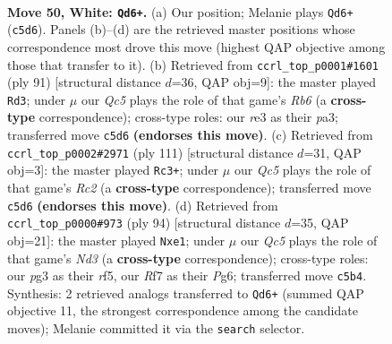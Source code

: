 \documentclass[11pt]{article}
\begin{document}
\clearpage

\begin{figure}[p]\centering
\begin{subfigure}{0.46\textwidth}\centering
\resizebox{\linewidth}{!}{%
\newchessgame
\chessboard[
  setfen={3k4/5R2/8/2QP4/8/4r1p1/P1P1p1P1/4K3 w - - 1 50},
  showmover=false,
  pgfstyle=straightmove, color=movearrow, markmove={c5-d6}
]}
\caption{}
\end{subfigure}\hfill
\begin{subfigure}{0.46\textwidth}\centering
\resizebox{\linewidth}{!}{%
\newchessgame
\chessboard[
  setfen={8/6k1/2K1p1p1/6Pp/R6P/Pr6/8/8 b - - 0 46},
  showmover=false,
  pgfstyle=straightmove, color=movearrow, markmove={b3-d3}
]}
\caption{}
\end{subfigure}
\\[4pt]
\begin{subfigure}{0.46\textwidth}\centering
\resizebox{\linewidth}{!}{%
\newchessgame
\chessboard[
  setfen={8/1pr5/7p/3pk3/1R4PP/1P2K3/8/8 b - - 6 56},
  showmover=false,
  pgfstyle=straightmove, color=movearrow, markmove={c7-c3}
]}
\caption{}
\end{subfigure}\hfill
\begin{subfigure}{0.46\textwidth}\centering
\resizebox{\linewidth}{!}{%
\newchessgame
\chessboard[
  setfen={6k1/6p1/6P1/5r2/P1P2p2/3N4/5PK1/4r3 w - - 0 48},
  showmover=false,
  pgfstyle=straightmove, color=movearrow, markmove={d3-e1}
]}
\caption{}
\end{subfigure}
\caption{\textbf{Move 50, White: \texttt{Qd6+}.} (a) Our position; Melanie plays \texttt{Qd6+} (\texttt{c5d6}). Panels (b)--(d) are the retrieved master positions whose correspondence most drove this move (highest QAP objective among those that transfer to it). (b) Retrieved from \texttt{ccrl\_top\_p0001\#1601} (ply 91) [structural distance $d$=36, QAP obj=9]: the master played \texttt{Rd3}; under $\mu$ our \emph{Qc5} plays the role of that game's \emph{Rb6} (a \textbf{cross-type} correspondence); cross-type roles: our \emph{r}e3 as their \emph{p}a3; transferred move \texttt{c5d6} \textbf{(endorses this move)}. (c) Retrieved from \texttt{ccrl\_top\_p0002\#2971} (ply 111) [structural distance $d$=31, QAP obj=3]: the master played \texttt{Rc3+}; under $\mu$ our \emph{Qc5} plays the role of that game's \emph{Rc2} (a \textbf{cross-type} correspondence); transferred move \texttt{c5d6} \textbf{(endorses this move)}. (d) Retrieved from \texttt{ccrl\_top\_p0000\#973} (ply 94) [structural distance $d$=35, QAP obj=21]: the master played \texttt{Nxe1}; under $\mu$ our \emph{Qc5} plays the role of that game's \emph{Nd3} (a \textbf{cross-type} correspondence); cross-type roles: our \emph{p}g3 as their \emph{r}f5, our \emph{R}f7 as their \emph{P}g6; transferred move \texttt{c5b4}. Synthesis: 2 retrieved analogs transferred to \texttt{Qd6+} (summed QAP objective 11, the strongest correspondence among the candidate moves); Melanie committed it via the \texttt{search} selector.}
\label{fig:thought-m98}
\end{figure}
\end{document}
